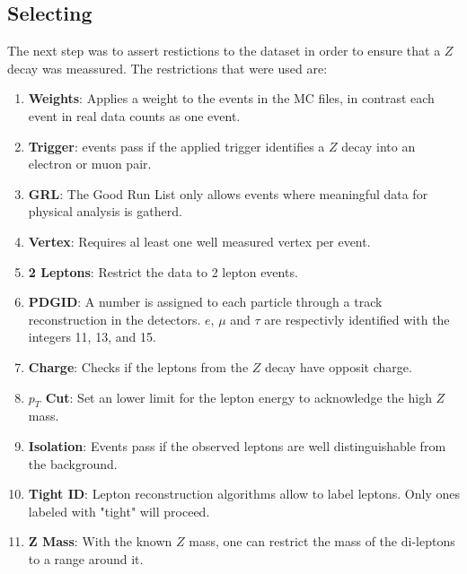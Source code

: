 \documentclass[12pt, a4paper, bibliography=totoc]{scrartcl}
\begin{document}
\begin{multicols}{2}
\subsection{Selecting} 
The next step was to assert restictions to the dataset in order to ensure that a $Z$ decay was meassured.
The restrictions that were used are:
\begin{enumerate}
    \item \textbf{Weights}: 
    Applies a weight to the events in the MC files, in contrast each event in real data counts as one event.
    \item \textbf{Trigger}: events pass if the applied trigger identifies a $Z$ decay into an electron or muon pair.
    \item \textbf{GRL}: The Good Run List only allows events where meaningful data for physical analysis is gatherd.
    \item \textbf{Vertex}: Requires al least one well measured vertex per event.
    \item \textbf{2 Leptons}: Restrict the data to 2 lepton events.
    \item \textbf{PDGID}: A number is assigned to each particle through a track reconstruction in the detectors. $e$, $\mu$ and $\tau$ are respectivly identified with the integers 11, 13, and 15.
    \item \textbf{Charge}: Checks if the leptons from the $Z$ decay have opposit charge.
    \item \textbf{$p_{T}$ Cut}: Set an lower limit for the lepton energy to acknowledge the high $Z$ mass.
    \item \textbf{Isolation}: Events pass if the observed leptons are well distinguishable from the background.
    \item \textbf{Tight ID}: Lepton reconstruction algorithms allow to label leptons. Only ones labeled with "tight" will proceed.
    \item \textbf{Z Mass}: With the known $Z$ mass, one can restrict the mass of the di-leptons to a range around it. 
        
\end{enumerate}


\end{multicols}
\end{document}

